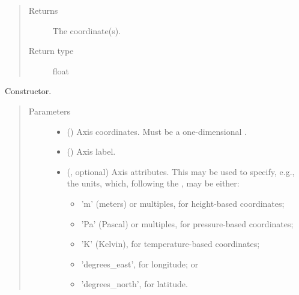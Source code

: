 \documentclass[letterpaper,10pt,english]{sphinxmanual}
\begin{document}
\begin{fulllineitems}
\begin{fulllineitems}
\begin{quote}
\begin{description}
\item[{Returns}] \leavevmode
The coordinate(s).

\item[{Return type}] \leavevmode
float

\end{description}\end{quote}

\end{fulllineitems}


\begin{fulllineitems}
\label{\detokenize{api:grids.axis.Axis.__init__}}
Constructor.
\begin{quote}\begin{description}
\item[{Parameters}] \leavevmode\begin{itemize}
\item {} 
 () \textendash{} Axis coordinates. Must be a one-dimensional .

\item {} 
 () \textendash{} Axis label.

\item {} 
 (, optional) \textendash{} 
Axis attributes. This may be used to specify, e.g., the units,
which, following the , may be either:
\begin{itemize}
\item {} 
’m’ (meters) or multiples, for height-based coordinates;

\item {} 
’Pa’ (Pascal) or multiples, for pressure-based coordinates;

\item {} 
’K’ (Kelvin), for temperature-based coordinates;

\item {} 
’degrees\_east’, for longitude; or

\item {} 
’degrees\_north’, for latitude.

\end{itemize}


\end{itemize}

\end{description}\end{quote}

\end{fulllineitems}


\end{fulllineitems}
\end{document}
